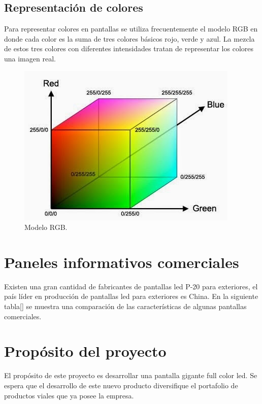 \subsection{Representación de colores}
Para representar colores en pantallas se utiliza frecuentemente el modelo RGB en donde cada color es la suma de tres colores básicos rojo, verde y azul. La mezcla de estos tres colores con diferentes intensidades tratan de representar los colores una imagen real.
\begin{figure}[htpb]
	\centering
	\includegraphics[scale=0.6]{Figures/modelorgb.jpg} 
	\caption{Modelo RGB\protect\footnotemark.}
	\label{fig:grafrgb}
\end{figure}




\section{Paneles informativos comerciales}
Existen una gran cantidad de fabricantes de pantallas led P-20 para exteriores, el país líder en producción de pantallas led para exteriores es China. En la siguiente tabla[] se muestra una comparación de las características de algunas pantallas comerciales.
 



\section{Propósito del proyecto}
El propósito de este proyecto es desarrollar una pantalla gigante full color led. Se espera que el desarrollo de este nuevo producto diversifique el portafolio de productos viales que ya posee la empresa.
